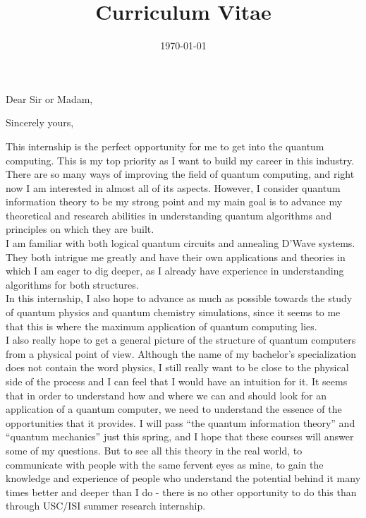 \documentclass[11pt,a4paper,sans]{moderncv} %
\title{Curriculum Vitae}
\begin{document}


\clearpage

\date{\today} %
\opening{Dear Sir or Madam,} %
\closing{Sincerely yours,} %

\makelettertitle{}%
		This internship is the perfect opportunity for me to get into the quantum computing. This is my top priority as I want to build my career in this industry.\\
There are so many ways of improving the field of quantum computing, and right now I am interested in almost all of its aspects. However, I consider quantum information theory to be my strong point and my main goal is to advance my theoretical and research abilities in understanding quantum algorithms and principles on which they are built.\\
I am familiar with both logical quantum circuits and annealing D'Wave systems. They both intrigue me greatly and have their own applications and theories in which I am eager to dig deeper, as I already have experience in understanding algorithms for both structures.\\
In this internship, I also hope to advance as much as possible towards the study of quantum physics and quantum chemistry simulations, since it seems to me that this is where the maximum application of quantum computing lies.\\
I also really hope to get a general picture of the structure of quantum computers from a physical point of view. Although the name of my bachelor's specialization does not contain the word physics, I still really want to be close to the physical side of the process and I can feel that I would have an intuition for it. It seems that in order to understand how and where we can and should look for an application of a quantum computer, we need to understand the essence of the opportunities that it provides. I will pass “the quantum information theory” and “quantum mechanics” just this spring, and I hope that these courses will answer some of my questions. But to see all this theory in the real world, to communicate with people with the same fervent eyes as mine, to gain the knowledge and experience of people who understand the potential behind it many times better and deeper than I do - there is no other opportunity to do this than through USC/ISI summer research internship.\\
\end{document}

